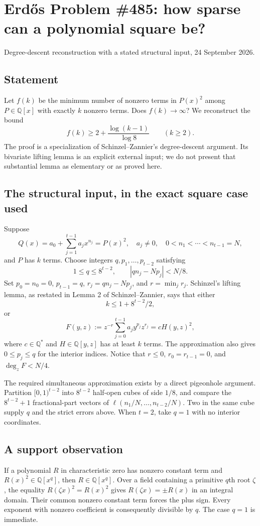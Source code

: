 \section{Erd\H{o}s Problem \#485: how sparse can a polynomial square be?}
\noindent Degree-descent reconstruction with a stated structural input, 24 September 2026.

\subsection*{Statement}
Let $f(k)$ be the minimum number of nonzero terms in $P(x)^2$ among $P\in\mathbb Q[x]$ with exactly $k$ nonzero terms. Does $f(k)\to\infty$? We reconstruct the bound
\[f(k)\ge2+\frac{\log(k-1)}{\log8}\qquad(k\ge2).\tag{1}\]
The proof is a specialization of Schinzel--Zannier's degree-descent argument. Its bivariate lifting lemma is an explicit external input; we do not present that substantial lemma as elementary or as proved here.

\subsection*{The structural input, in the exact square case used}
Suppose
\[Q(x)=a_0+\sum_{j=1}^{t-1}a_jx^{n_j}=P(x)^2,
\quad a_j\ne0,\quad0<n_1<\cdots<n_{t-1}=N,
\]
and $P$ has $k$ terms. Choose integers $q,p_1,\ldots,p_{t-2}$ satisfying
\[1\le q\le8^{t-2},\qquad |qn_j-Np_j|<N/8.
\]
Set $p_0=n_0=0$, $p_{t-1}=q$, $r_j=qn_j-Np_j$, and $r=\min_j r_j$. Schinzel's lifting lemma, as restated in Lemma 2 of Schinzel--Zannier, says that either
\[k\le1+8^{t-2}/2,
\]
or
\[F(y,z):=z^{-r}\sum_{j=0}^{t-1}a_jy^{p_j}z^{r_j}
=cH(y,z)^2,\tag{2}\]
where $c\in\mathbb Q^*$ and $H\in\mathbb Q[y,z]$ has at least $k$ terms. The approximation also gives $0\le p_j\le q$ for the interior indices. Notice that $r\le0$, $r_0=r_{t-1}=0$, and $\deg_zF<N/4$.

The required simultaneous approximation exists by a direct pigeonhole argument. Partition $[0,1)^{t-2}$ into $8^{t-2}$ half-open cubes of side $1/8$, and compare the $8^{t-2}+1$ fractional-part vectors of $\ell(n_1/N,\ldots,n_{t-2}/N)$. Two in the same cube supply $q$ and the strict errors above. When $t=2$, take $q=1$ with no interior coordinates.

\subsection*{A support observation}
If a polynomial $R$ in characteristic zero has nonzero constant term and $R(x)^2\in\mathbb Q[x^q]$, then $R\in\mathbb Q[x^q]$. Over a field containing a primitive $q$th root $\zeta$, the equality $R(\zeta x)^2=R(x)^2$ gives $R(\zeta x)=\pm R(x)$ in an integral domain. Their common nonzero constant term forces the plus sign. Every exponent with nonzero coefficient is consequently divisible by $q$. The case $q=1$ is immediate.

